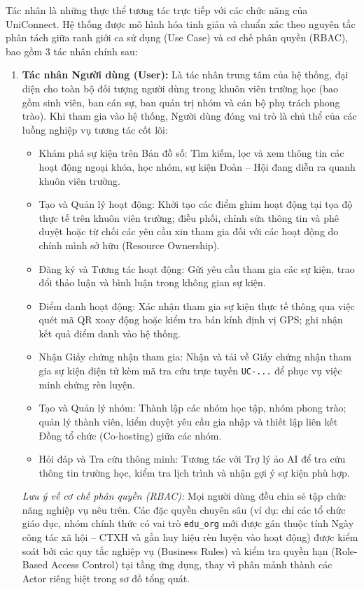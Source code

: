 Tác nhân là những thực thể tương tác trực tiếp với các chức năng của UniConnect. Hệ thống được mô hình hóa tinh giản và chuẩn xác theo nguyên tắc phân tách giữa ranh giới ca sử dụng (Use Case) và cơ chế phân quyền (RBAC), bao gồm 3 tác nhân chính sau:

\begin{enumerate}
    \item \textbf{Tác nhân Người dùng (User):}
    Là tác nhân trung tâm của hệ thống, đại diện cho toàn bộ đối tượng người dùng trong khuôn viên trường học (bao gồm sinh viên, ban cán sự, ban quản trị nhóm và cán bộ phụ trách phong trào). Khi tham gia vào hệ thống, Người dùng đóng vai trò là chủ thể của các luồng nghiệp vụ tương tác cốt lõi:
    \begin{itemize}
        \item Khám phá sự kiện trên Bản đồ số: Tìm kiếm, lọc và xem thông tin các hoạt động ngoại khóa, học nhóm, sự kiện Đoàn -- Hội đang diễn ra quanh khuôn viên trường.
        
        \item Tạo và Quản lý hoạt động: Khởi tạo các điểm ghim hoạt động tại tọa độ thực tế trên khuôn viên trường; điều phối, chỉnh sửa thông tin và phê duyệt hoặc từ chối các yêu cầu xin tham gia đối với các hoạt động do chính mình sở hữu (Resource Ownership).
        
        \item Đăng ký và Tương tác hoạt động: Gửi yêu cầu tham gia các sự kiện, trao đổi thảo luận và bình luận trong không gian sự kiện.
        
        \item Điểm danh hoạt động: Xác nhận tham gia sự kiện thực tế thông qua việc quét mã QR xoay động hoặc kiểm tra bán kính định vị GPS; ghi nhận kết quả điểm danh vào hệ thống.
        
        \item Nhận Giấy chứng nhận tham gia: Nhận và tải về Giấy chứng nhận tham gia sự kiện điện tử kèm mã tra cứu trực tuyến \texttt{UC-...} để phục vụ việc minh chứng rèn luyện.
        
        \item Tạo và Quản lý nhóm: Thành lập các nhóm học tập, nhóm phong trào; quản lý thành viên, kiểm duyệt yêu cầu gia nhập và thiết lập liên kết Đồng tổ chức (Co-hosting) giữa các nhóm.
        
        \item Hỏi đáp và Tra cứu thông minh: Tương tác với Trợ lý ảo AI để tra cứu thông tin trường học, kiểm tra lịch trình và nhận gợi ý sự kiện phù hợp.
    \end{itemize}
    \textit{Lưu ý về cơ chế phân quyền (RBAC):} Mọi người dùng đều chia sẻ tập chức năng nghiệp vụ nêu trên. Các đặc quyền chuyên sâu (ví dụ: chỉ các tổ chức giáo dục, nhóm chính thức có vai trò \texttt{edu\_org} mới được gán thuộc tính Ngày công tác xã hội -- CTXH và gắn huy hiệu rèn luyện vào hoạt động) được kiểm soát bởi các quy tắc nghiệp vụ (Business Rules) và kiểm tra quyền hạn (Role-Based Access Control) tại tầng ứng dụng, thay vì phân mảnh thành các Actor riêng biệt trong sơ đồ tổng quát.


\end{enumerate}

